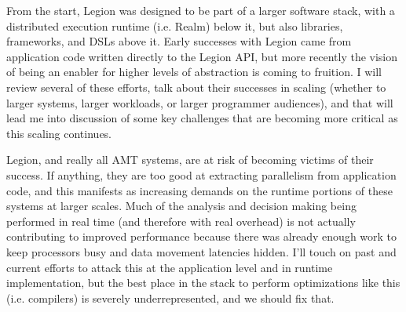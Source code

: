 From the start, Legion was designed to be part of a larger software stack, with a distributed execution runtime (i.e. Realm) below it, but also libraries, frameworks, and DSLs above it. Early successes with Legion came from application code written directly to the Legion API, but more recently the vision of being an enabler for higher levels of abstraction is coming to fruition. I will review several of these efforts, talk about their successes in scaling (whether to larger systems, larger workloads, or larger programmer audiences), and that will lead me into discussion of some key challenges that are becoming more critical as this scaling continues.

Legion, and really all AMT systems, are at risk of becoming victims of their success. If anything, they are too good at extracting parallelism from application code, and this manifests as increasing demands on the runtime portions of these systems at larger scales. Much of the analysis and decision making being performed in real time (and therefore with real overhead) is not actually contributing to improved performance because there was already enough work to keep processors busy and data movement latencies hidden. I'll touch on past and current efforts to attack this at the application level and in runtime implementation, but the best place in the stack to perform optimizations like this (i.e. compilers) is severely underrepresented, and we should fix that. 

